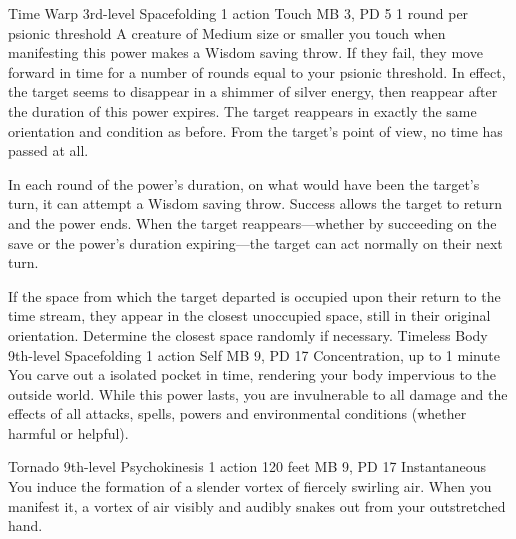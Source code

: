 \DndPowerHeader%
    {Time Warp\label{pwr:time_warp}}
    {3rd-level Spacefolding}
    {1 action}
    {Touch}
    {MB 3, PD 5}
    {1 round per psionic threshold}
A creature of Medium size or smaller you
touch when manifesting this power makes a Wisdom saving throw.
If they fail, they move forward in time for a number of rounds
equal to your psionic threshold. In effect, the target seems
to disappear in a shimmer of silver energy, then reappear
after the duration of this power expires. The target reappears
in exactly the same orientation and condition as before. From
the target's point of view, no time has passed at all.

In each round of the power's duration, on what would have
been the target's turn, it can attempt a Wisdom saving throw.
Success allows the target to return and the power ends. When
the target reappears---whether by succeeding on the save or
the power's duration expiring---the target can act normally
on their next turn.

If the space from which the target departed is occupied upon
their return to the time stream, they appear in the closest
unoccupied space, still in their original orientation. Determine
the closest space randomly if necessary.
\DndPowerHeader%
    {Timeless Body\label{pwr:timeless_body}}
    {9th-level Spacefolding}
    {1 action}
    {Self}
    {MB 9, PD 17}
    {Concentration, up to 1 minute}
You carve out a isolated pocket in time,
rendering your body impervious to the outside world. While
this power lasts, you are invulnerable to all damage and the
effects of all attacks, spells, powers and environmental conditions
(whether harmful or helpful).

\DndPowerHeader%
    {Tornado\label{pwr:tornado}}
    {9th-level Psychokinesis}
    {1 action}
    {120 feet}
    {MB 9, PD 17}
    {Instantaneous}
You induce the formation of a slender vortex
of fiercely swirling air. When you manifest it, a vortex of
air visibly and audibly snakes out from your outstretched
hand.

